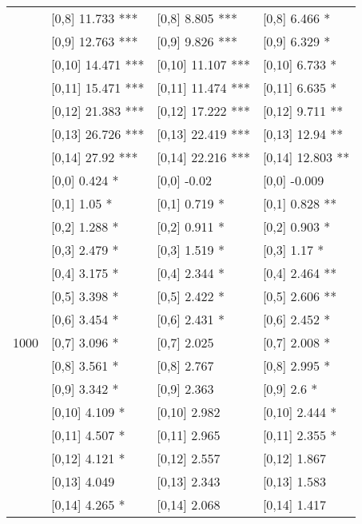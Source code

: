 \begin{table}
\begin{tabular}[t]{llll}
 & {}[0,8] 11.733 *** & {}[0,8] 8.805 *** & {}[0,8] 6.466 *\\
 & {}[0,9] 12.763 *** & {}[0,9] 9.826 *** & {}[0,9] 6.329 *\\
\addlinespace
 & {}[0,10] 14.471 *** & {}[0,10] 11.107 *** & {}[0,10] 6.733 *\\
 & {}[0,11] 15.471 *** & {}[0,11] 11.474 *** & {}[0,11] 6.635 *\\
 & {}[0,12] 21.383 *** & {}[0,12] 17.222 *** & {}[0,12] 9.711 **\\
 & {}[0,13] 26.726 *** & {}[0,13] 22.419 *** & {}[0,13] 12.94 **\\
 & {}[0,14] 27.92 *** & {}[0,14] 22.216 *** & {}[0,14] 12.803 **\\
\addlinespace
 & {}[0,0] 0.424 * & {}[0,0] -0.02 & {}[0,0] -0.009\\
 & {}[0,1] 1.05 * & {}[0,1] 0.719 * & {}[0,1] 0.828 **\\
 & {}[0,2] 1.288 * & {}[0,2] 0.911 * & {}[0,2] 0.903 *\\
 & {}[0,3] 2.479 * & {}[0,3] 1.519 * & {}[0,3] 1.17 *\\
 & {}[0,4] 3.175 * & {}[0,4] 2.344 * & {}[0,4] 2.464 **\\
\addlinespace
 & {}[0,5] 3.398 * & {}[0,5] 2.422 * & {}[0,5] 2.606 **\\
 & {}[0,6] 3.454 * & {}[0,6] 2.431 * & {}[0,6] 2.452 *\\
1000 & {}[0,7] 3.096 * & {}[0,7] 2.025 & {}[0,7] 2.008 *\\
 & {}[0,8] 3.561 * & {}[0,8] 2.767 & {}[0,8] 2.995 *\\
 & {}[0,9] 3.342 * & {}[0,9] 2.363 & {}[0,9] 2.6 *\\
\addlinespace
 & {}[0,10] 4.109 * & {}[0,10] 2.982 & {}[0,10] 2.444 *\\
 & {}[0,11] 4.507 * & {}[0,11] 2.965 & {}[0,11] 2.355 *\\
 & {}[0,12] 4.121 * & {}[0,12] 2.557 & {}[0,12] 1.867\\
 & {}[0,13] 4.049 & {}[0,13] 2.343 & {}[0,13] 1.583\\
 & {}[0,14] 4.265 * & {}[0,14] 2.068 & {}[0,14] 1.417\\
\bottomrule
\end{tabular}
\end{table}
